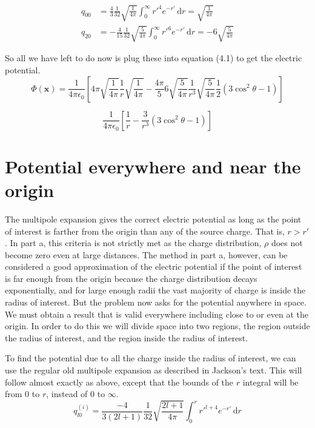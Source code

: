 \documentclass[10pt,a4paper]{article}
\begin{document}
\begin{subequations}
\begin{align}
q_{00}&=\frac{4}{3}\frac{1}{32}\sqrt{\frac{1}{4\pi}}\int_0^\infty {r'}^4 e^{-r'} \,\mathrm{d}r = \sqrt{\frac{1}{4\pi}} \\
q_{20}&=-\frac{4}{15}\frac{1}{32}\sqrt{\frac{5}{4\pi}}\int_0^\infty {r'}^6 e^{-r'} \,\mathrm{d}r = -6\sqrt{\frac{5}{4\pi}}
\end{align}
\end{subequations}

So all we have left to do now is plug these into equation (4.1) to get the electric potential.
\begin{equation}
\Phi(\mathbf{x})=\frac{1}{4\pi\epsilon_0}\left[4\pi\sqrt{\frac{1}{4\pi}}\frac{1}{r}\sqrt{\frac{1}{4\pi}}-\frac{4\pi}{5}6\sqrt{\frac{5}{4\pi}}\frac{1}{r^3}\sqrt{\frac{5}{4\pi}}\frac{1}{2}(3\cos^2\theta-1)\right]
\end{equation}

\begin{equation}
\boxed{
\frac{1}{4\pi\epsilon_0}\left[\frac{1}{r}-\frac{3}{r^3}(3\cos^2\theta-1)\right]
}
\end{equation}

\section{Potential everywhere and near the origin}
The multipole expansion gives the correct electric potential as long as the point of interest is farther from the origin than any of the source charge.  That is, $r>r'$.  In part a, this criteria is not strictly met as the charge distribution, $\rho$ does not become zero even at large distances.  The method in part a, however, can be considered a good approximation of the electric potential if the point of interest is far enough from the origin because the charge distribution decays exponentially, and for large enough radii the vast majority of charge is inside the radius of interest.  But the problem now asks for the potential anywhere in space.  We must obtain a result that is valid everywhere including close to or even at the origin.  In order to do this we will divide space into two regions, the region outside the radius of interest, and the region inside the radius of interest.

To find the potential due to all the charge inside the radius of interest, we can use the regular old multipole expansion as described in Jackson's text.  This will follow almost exactly as above, except that the bounds of the $r$ integral will be from $0$ to $r$, instead of $0$ to $\infty$.
\begin{equation}
q^{(i)}_{l0}=\frac{-4}{3(2l+1)}\frac{1}{32}\sqrt{\frac{2l+1}{4\pi}}\int_0^r {r'}^{l+4}e^{-r'}\,\mathrm{d}r
\end{equation}
\end{document}
